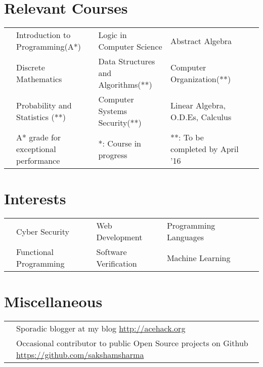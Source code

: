 \documentclass[11pt,a4paper]{article}
\begin{document}
\vspace{-0.6cm}
\section*{Relevant Courses}
\vspace{-0.3cm}
\begin{tabular}{L{0.05cm} L{5.8cm} L{6.5cm} L{7.5cm} L{8cm} L{13cm}}
  & Introduction to Programming(A*)  & Logic in Computer Science & Abstract Algebra\\
& Discrete Mathematics             & Data Structures and Algorithms(**) & Computer Organization(**)\\
& Probability and Statistics (**)  & Computer Systems Security(**) & Linear Algebra, O.D.Es, Calculus\\
  \vspace{0.3cm}
& \footnotesize{A* grade for exceptional performance}
& \footnotesize{*: Course in progress}
& \footnotesize{**: To be completed by April '16}
\end{tabular}

\vspace{-0.8cm}
\section*{Interests}
\vspace{-0.3cm}
\begin{tabular}{L{0.05cm} L{5.8cm} L{6.5cm} L{7.5cm} L{8cm} L{13cm}}
  & Cyber Security         & Web Development       & Programming Languages\\
  & Functional Programming & Software Verification & Machine Learning
\end{tabular}

\vspace{-0.5cm}
\section*{Miscellaneous}
\vspace{-0.3cm}
\begin{tabular}{L{0.05cm} l}
  & Sporadic blogger at my blog \url{http://acehack.org}\\
  & Occasional contributor to public Open Source projects on Github \url{https://github.com/sakshamsharma}
\end{tabular}
\end{document}
